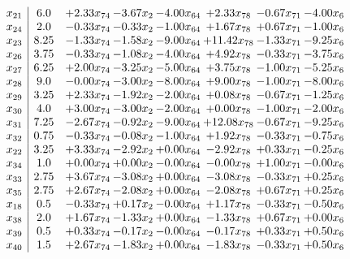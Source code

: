 \documentclass[8pt]{article}
\begin{document}
\[\begin{array}{c| c c@{\hskip 2pt} c@{\hskip 2pt} c@{\hskip 2pt} c@{\hskip 2pt} c@{\hskip 2pt} c@{\hskip 2pt} }
 x_{21}   &  6.0 & +  2.33 x_{74} & -3.67 x_{2} & -4.00 x_{64} & +  2.33 x_{78} & -0.67 x_{71} & -4.00 x_{6}\\
 x_{24}   &  2.0 & -0.33 x_{74} & -0.33 x_{2} & -1.00 x_{64} & +  1.67 x_{78} & +  0.67 x_{71} & -1.00 x_{6}\\
 x_{23}   &  8.25 & -1.33 x_{74} & -1.58 x_{2} & -9.00 x_{64} & + 11.42 x_{78} & -1.33 x_{71} & -9.25 x_{6}\\
 x_{26}   &  3.75 & -0.33 x_{74} & -1.08 x_{2} & -4.00 x_{64} & +  4.92 x_{78} & -0.33 x_{71} & -3.75 x_{6}\\
 x_{27}   &  6.25 & +  2.00 x_{74} & -3.25 x_{2} & -5.00 x_{64} & +  3.75 x_{78} & -1.00 x_{71} & -5.25 x_{6}\\
 x_{28}   &  9.0 & -0.00 x_{74} & -3.00 x_{2} & -8.00 x_{64} & +  9.00 x_{78} & -1.00 x_{71} & -8.00 x_{6}\\
 x_{29}   &  3.25 & +  2.33 x_{74} & -1.92 x_{2} & -2.00 x_{64} & +  0.08 x_{78} & -0.67 x_{71} & -1.25 x_{6}\\
 x_{30}   &  4.0 & +  3.00 x_{74} & -3.00 x_{2} & -2.00 x_{64} & +  0.00 x_{78} & -1.00 x_{71} & -2.00 x_{6}\\
 x_{31}   &  7.25 & -2.67 x_{74} & -0.92 x_{2} & -9.00 x_{64} & + 12.08 x_{78} & -0.67 x_{71} & -9.25 x_{6}\\
 x_{32}   &  0.75 & -0.33 x_{74} & -0.08 x_{2} & -1.00 x_{64} & +  1.92 x_{78} & -0.33 x_{71} & -0.75 x_{6}\\
 x_{22}   &  3.25 & +  3.33 x_{74} & -2.92 x_{2} & +  0.00 x_{64} & -2.92 x_{78} & +  0.33 x_{71} & -0.25 x_{6}\\
 x_{34}   &  1.0 & +  0.00 x_{74} & +  0.00 x_{2} & -0.00 x_{64} & -0.00 x_{78} & +  1.00 x_{71} & -0.00 x_{6}\\
 x_{33}   &  2.75 & +  3.67 x_{74} & -3.08 x_{2} & +  0.00 x_{64} & -3.08 x_{78} & -0.33 x_{71} & +  0.25 x_{6}\\
 x_{35}   &  2.75 & +  2.67 x_{74} & -2.08 x_{2} & +  0.00 x_{64} & -2.08 x_{78} & +  0.67 x_{71} & +  0.25 x_{6}\\
 x_{18}   &  0.5 & -0.33 x_{74} & +  0.17 x_{2} & -0.00 x_{64} & +  1.17 x_{78} & -0.33 x_{71} & -0.50 x_{6}\\
 x_{38}   &  2.0 & +  1.67 x_{74} & -1.33 x_{2} & +  0.00 x_{64} & -1.33 x_{78} & +  0.67 x_{71} & +  0.00 x_{6}\\
 x_{39}   &  0.5 & +  0.33 x_{74} & -0.17 x_{2} & -0.00 x_{64} & -0.17 x_{78} & +  0.33 x_{71} & +  0.50 x_{6}\\
 x_{40}   &  1.5 & +  2.67 x_{74} & -1.83 x_{2} & +  0.00 x_{64} & -1.83 x_{78} & -0.33 x_{71} & +  0.50 x_{6}\\

\end{array}\]
\end{document}
